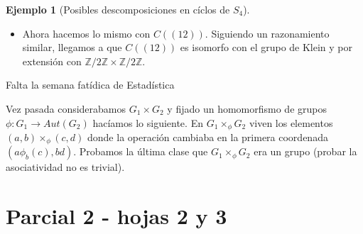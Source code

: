 \documentclass{book}
\theoremstyle{definition}
\newtheorem{ej}{Ejemplo}
\theoremstyle{remark}
\newcommand{\Z}{\mathbb{Z}}
\begin{document}
\begin{ej}[Posibles descomposiciones en cíclos de $S_4$]
\begin{itemize}
\begin{itemize}
			Tiene toda la pinta de ser $D_4$ porque está generado por dos elementos, no es abeliano y los órdenes de los generadores son $o((1324)) = 4,\ o((12)) = 2$. Solo nos quedaría probar que se sigue cumpliendo la ecuación de la presentación de $D_4$:
			\begin{align*}
				BA = AB^3 \iff (1324)(12) = (12)(1324)^3
			\end{align*}
			Lo comprobamos y al final sale.
		\end{itemize}
	
		\item Ahora hacemos lo mismo con $C((12))$. Siguiendo un razonamiento similar, llegamos a que $C((12))$ es isomorfo con el grupo de Klein y por extensión con $\Z/2\Z \times \Z/2\Z$.
	\end{itemize}
\end{ej}


Falta la semana fatídica de Estadística

Vez pasada considerabamos $G_1 \times G_2$ y fijado un homomorfismo de grupos $\phi: G_1 \to Aut(G_2)$ hacíamos lo siguiente. En $G_1 \times_{\phi} G_2$ viven los elementos $(a,b) \times_{\phi} (c,d)$ donde la operación cambiaba en la primera coordenada $(a \phi_b(c), bd)$. Probamos la última clase que $G_1 \times_{\phi} G_2$ era un grupo (probar la asociatividad no es trivial).


\part{Parcial 2 - hojas 2 y 3}




\end{document}
